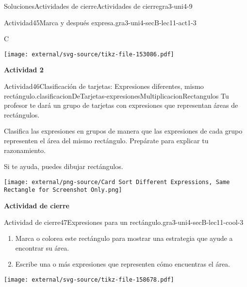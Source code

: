 \documentclass[twoside,10pt,]{article}
\begin{document}
\begin{solutions-section}{Soluciones}{Actividades de cierre}{}{Actividades de cierre}{}{}{gra3-uni4-9}
\begin{activitysolution}{Actividad}{45}{Marca y después expresa.}{gra3-uni4-secB-lec11-act1-3}
\begin{sidebyside}{3}{0}{0}{0}
\begin{sbspanel}{0.348}%
C%
\par
\texttt{[image: external/svg-source/tikz-file-153086.pdf]}
\end{sbspanel}%
\end{sidebyside}%
\end{activitysolution}%
\par\medskip
\noindent\textbf{\large{}\space\textperiodcentered\space{}Actividad 2}
\begin{activitysolution}{Actividad}{46}{Clasificación de tarjetas: Expresiones diferentes, mismo rectángulo.}{clasificacionDeTarjetas-expresionesMultiplicacionRectangulos}%
Tu profesor te dará un grupo de tarjetas con expresiones que representan áreas de rectángulos.%
\par
Clasifica las expresiones en grupos de manera que las expresiones de cada grupo representen el área del mismo rectángulo. Prepárate para explicar tu razonamiento.%
\par
Si te ayuda, puedes dibujar rectángulos.%
\begin{image}{0}{1}{0}{}%
\texttt{[image: external/png-source/Card Sort Different Expressions, Same Rectangle for Screenshot Only.png]}
\end{image}%
\end{activitysolution}%
\par\medskip
\noindent\textbf{\large{}\space\textperiodcentered\space{}Actividad de cierre}
\begin{projectsolution}{Actividad de cierre}{47}{Expresiones para un rectángulo.}{gra3-uni4-secB-lec11-cool-3}%
\begin{sidebyside}{2}{0}{0}{0}%
\begin{sbspanel}{0.6}%
%
\begin{enumerate}
\item{}Marca o colorea este rectángulo para mostrar una estrategia que ayude a encontrar su área.%
\item{}Escribe una o más expresiones que representen cómo encuentras el área.%
\end{enumerate}
\end{sbspanel}%
\begin{sbspanel}{0.4}%
\texttt{[image: external/svg-source/tikz-file-158678.pdf]}
\end{sbspanel}%
\end{sidebyside}%
\end{projectsolution}%
\par\medskip

\end{solutions-section}
\end{document}
